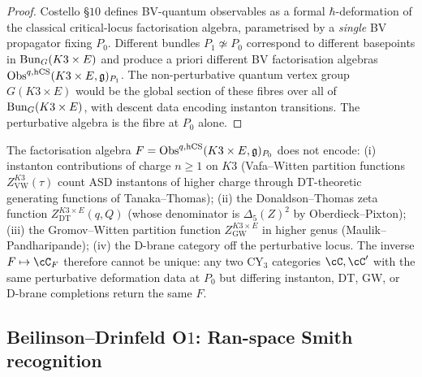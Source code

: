 \begin{proof}
Costello \cite{Costello2011} \S$10$ defines BV-quantum observables as a
formal $\hbar$-deformation of the classical critical-locus
factorisation algebra, parametrised by a \emph{single} BV propagator
fixing $P_0$. Different bundles $P_1\not\simeq P_0$ correspond to
different basepoints in $\mathrm{Bun}_G(K3\times E)$ and produce a priori
different BV factorisation algebras
$\mathrm{Obs}^{q,\mathrm{hCS}}(K3\times E,\mathfrak{g})_{P_1}$. The non-perturbative quantum
vertex group $G(K3\times E)$ would be the global section of these
fibres over all of $\mathrm{Bun}_G(K3\times E)$, with descent data encoding
instanton transitions. The perturbative algebra is the fibre at $P_0$
alone.
\end{proof}

\begin{corollary}
\label{cor:agent08-non-perturbative-loss}
The factorisation algebra
$F = \mathrm{Obs}^{q,\mathrm{hCS}}(K3\times E,\mathfrak{g})_{P_0}$ does not encode:
\textup{(i)} instanton contributions of charge $n\geq 1$ on $K3$
\textup{(}Vafa--Witten partition functions
$Z^{K3}_{\mathrm{VW}}(\tau)$ count ASD instantons of higher charge
through DT-theoretic generating functions of Tanaka--Thomas\textup{);}
\textup{(ii)} the Donaldson--Thomas zeta function
$Z^{K3\times E}_{\mathrm{DT}}(q,Q)$ \textup{(}whose denominator is
$\Delta_5(Z)^{2}$ by Oberdieck--Pixton\textup{);}
\textup{(iii)} the Gromov--Witten partition function
$Z^{K3\times E}_{\mathrm{GW}}$ in higher genus
\textup{(}Maulik--Pandharipande\textup{);}
\textup{(iv)} the D-brane category off the perturbative locus.
The inverse $F\mapsto\cC_F$ therefore cannot be unique: any two CY$_3$
categories $\cC,\cC'$ with the same perturbative deformation data at
$P_0$ but differing instanton, DT, GW, or D-brane completions return
the same $F$.
\end{corollary}

\subsection{Beilinson--Drinfeld O\texorpdfstring{$1$}{1}: Ran-space Smith recognition}
\label{wn:subsec:agent08-O1-ran-smith}

